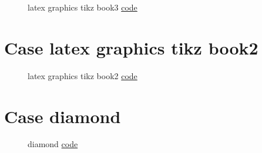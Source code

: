 \documentclass{article}
\begin{document}
\begin{figure}[H]
	\centering
	
	\caption{latex graphics tikz book3 \href{https:/github.com/cauliyang/learn_tikz/blob/main/source/latex_graphics_tikz_book3.tex}{code} }
	\label{fig:latex graphics tikz book3}
\end{figure}

\section{Case latex graphics tikz book2}

\begin{figure}[H]
	\centering
	
	\caption{latex graphics tikz book2 \href{https:/github.com/cauliyang/learn_tikz/blob/main/source/latex_graphics_tikz_book2.tex}{code} }
	\label{fig:latex graphics tikz book2}
\end{figure}

\section{Case diamond}

\begin{figure}[H]
	\centering
	
	\caption{diamond \href{https:/github.com/cauliyang/learn_tikz/blob/main/source/diamond.tex}{code} }
	\label{fig:diamond}
\end{figure}
\end{document}
